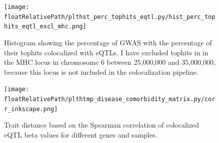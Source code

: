 %
\begin{figure}[!tbp]
    \centering
%
    \texttt{[image: \\floatRelativePath/plthst\_perc\_tophits\_eqtl.py/hist\_perc\_tophits\_eqtl\_excl\_mhc.png]}
%
    \caption{Histogram showing the percentage of GWAS with the percentage of their tophits colocalized with eQTLs.
    I have excluded tophits in in the MHC locus in chromosome 6 between 25,000,000 and 35,000,000,
    because this locus is not included in the colocalization pipeline.}
    \label{fig:hist_perc_tophits_eqtl_excl_mhc}
%
\end{figure}

%
\begin{figure}[!tbp]
    \centering
%
    \texttt{[image: \\floatRelativePath/plthtmp\_disease\_comorbidity\_matrix.py/corr\_inkscape.png]}
%
    \caption{Trait distance based on the Spearman correlation of colocalized eQTL beta values for different genes and samples.}
    \label{fig:gwas_distance}
%
\end{figure}

